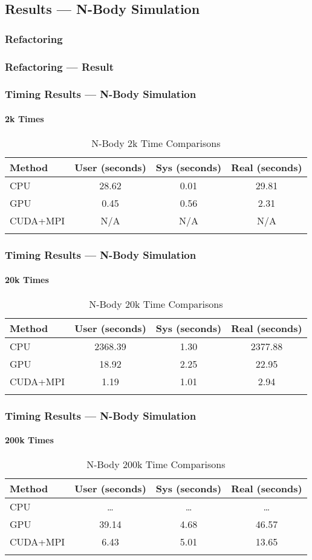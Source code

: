 \documentclass{beamer}
\begin{document}
\subsection{Results --- N-Body Simulation}
\begin{frame}
\frametitle{Refactoring}

\end{frame}
\begin{frame}
\frametitle{Refactoring --- Result}

\end{frame}
\begin{frame}
\frametitle{Timing Results --- N-Body Simulation}
\framesubtitle{2k Times}
\begin{table}[htb]
\centering{}
\begin{tabular}{lccc}
\toprule{}
\textbf{Method} & \textbf{User (seconds)} &
\textbf{Sys (seconds)} & \textbf{Real (seconds)} \\
\midrule{}
CPU      & 28.62 & 0.01 & 29.81 \\
\midrule{}
GPU      & 0.45 & 0.56 &  2.31 \\
\midrule{}
CUDA+MPI & N/A & N/A & N/A \\
\bottomrule{}
\end{tabular}
\caption{N-Body 2k Time Comparisons}
\end{table}
\end{frame}
\begin{frame}
\frametitle{Timing Results --- N-Body Simulation}
\framesubtitle{20k Times}
\begin{table}[htb]
\begin{tabular}{lccc}
\toprule{}
\textbf{Method} & \textbf{User (seconds)} &
\textbf{Sys (seconds)} & \textbf{Real (seconds)} \\
\midrule{}
CPU      & 2368.39 & 1.30 & 2377.88 \\
\midrule{}
GPU      & 18.92 & 2.25 & 22.95 \\
\midrule{}
CUDA+MPI & 1.19 & 1.01 & 2.94 \\
\bottomrule{}
\end{tabular}
\caption{N-Body 20k Time Comparisons}
\end{table}
\end{frame}
\begin{frame}
\frametitle{Timing Results --- N-Body Simulation}
\framesubtitle{200k Times}
\begin{table}[htb]
\begin{tabular}{lccc}
\toprule{}
\textbf{Method} & \textbf{User (seconds)} &
\textbf{Sys (seconds)} & \textbf{Real (seconds)} \\
\midrule{}
CPU      & \dots{} & \dots{} & \dots{} \\
\midrule{}
GPU      & 39.14 & 4.68 & 46.57 \\
\midrule{}
CUDA+MPI & 6.43 & 5.01 & 13.65 \\
\bottomrule{}
\end{tabular}
\caption{N-Body 200k Time Comparisons}
\end{table}
\end{frame}
\end{document}
